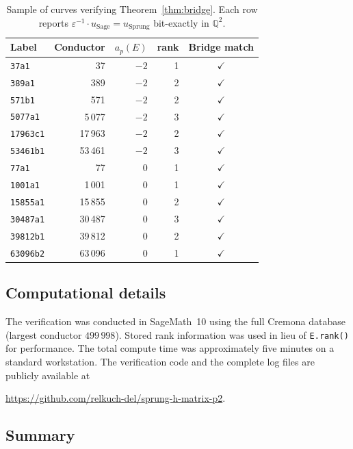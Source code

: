 \documentclass[11pt,a4paper]{amsart}
\theoremstyle{definition}
\newcommand{\Q}{\mathbb{Q}}
\newcommand{\eps}{\varepsilon}
\begin{document}
\begin{table}[h]
\centering
\begin{tabular}{l|r|r|r|c}
Label & Conductor & $a_p(E)$ & rank & Bridge match \\
\hline
\texttt{37a1}     & 37      & $-2$ & 1 & $\checkmark$ \\
\texttt{389a1}    & 389     & $-2$ & 2 & $\checkmark$ \\
\texttt{571b1}    & 571     & $-2$ & 2 & $\checkmark$ \\
\texttt{5077a1}   & 5\,077   & $-2$ & 3 & $\checkmark$ \\
\texttt{17963c1}  & 17\,963  & $-2$ & 2 & $\checkmark$ \\
\texttt{53461b1}  & 53\,461  & $-2$ & 3 & $\checkmark$ \\
\texttt{77a1}     & 77      & $0$  & 1 & $\checkmark$ \\
\texttt{1001a1}   & 1\,001   & $0$  & 1 & $\checkmark$ \\
\texttt{15855a1}  & 15\,855  & $0$  & 2 & $\checkmark$ \\
\texttt{30487a1}  & 30\,487  & $0$  & 3 & $\checkmark$ \\
\texttt{39812b1}  & 39\,812  & $0$  & 2 & $\checkmark$ \\
\texttt{63096b2}  & 63\,096  & $0$  & 1 & $\checkmark$ \\
\hline
\end{tabular}
\caption{Sample of curves verifying Theorem~\ref{thm:bridge}. Each row reports $\eps^{-1} \cdot u_{\mathrm{Sage}} = u_{\mathrm{Sprung}}$ bit-exactly in $\Q^2$.}
\label{tab:sample}
\end{table}

\subsection{Computational details}

The verification was conducted in SageMath~10 using the full Cremona database \cite{Cremona} (largest conductor $499\,998$). Stored rank information was used in lieu of \texttt{E.rank()} for performance. The total compute time was approximately five minutes on a standard workstation. The verification code and the complete log files are publicly available at
\begin{center}
\url{https://github.com/relkuch-del/sprung-h-matrix-p2}.
\end{center}

\subsection{Summary}
\end{document}
